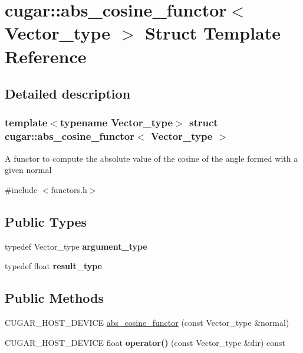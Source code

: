 \hypertarget{structcugar_1_1abs__cosine__functor}{}\section{cugar\+:\+:abs\+\_\+cosine\+\_\+functor$<$ Vector\+\_\+type $>$ Struct Template Reference}
\label{structcugar_1_1abs__cosine__functor}


\subsection{Detailed description}
\subsubsection*{template$<$typename Vector\+\_\+type$>$\newline
struct cugar\+::abs\+\_\+cosine\+\_\+functor$<$ Vector\+\_\+type $>$}

A functor to compute the absolute value of the cosine of the angle formed with a given normal 

{\ttfamily \#include $<$functors.\+h$>$}

\subsection*{Public Types}
\begin{DoxyCompactItemize}
\item 
\mbox{\label{structcugar_1_1abs__cosine__functor_ac2dce480580468ea5589271deaf912e5}} 
typedef Vector\+\_\+type {\bfseries argument\+\_\+type}
\item 
\mbox{\label{structcugar_1_1abs__cosine__functor_a7e73f252134cf7e00b6c87c975b55acf}} 
typedef float {\bfseries result\+\_\+type}
\end{DoxyCompactItemize}
\subsection*{Public Methods}
\begin{DoxyCompactItemize}
\item 
C\+U\+G\+A\+R\+\_\+\+H\+O\+S\+T\+\_\+\+D\+E\+V\+I\+CE \hyperlink{structcugar_1_1abs__cosine__functor_ab1d60f9df4d49c5b5007614a6526e68e}{abs\+\_\+cosine\+\_\+functor} (const Vector\+\_\+type \&normal)
\item 
\mbox{\label{structcugar_1_1abs__cosine__functor_ae16d3796c1278964fda6fb8f4804c4a7}} 
C\+U\+G\+A\+R\+\_\+\+H\+O\+S\+T\+\_\+\+D\+E\+V\+I\+CE float {\bfseries operator()} (const Vector\+\_\+type \&dir) const
\end{DoxyCompactItemize}
